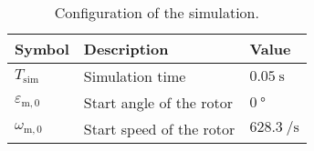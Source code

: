 \begin{table}[htb]
    \caption{Configuration of the simulation.}
    \centering
    \begin{tabular}{lll}\toprule
    Symbol  & Description       & Value \\
    \midrule
    $T_{\mathrm{sim}}$  & Simulation time           & $\SI{0.05}{\second}$ \\
    $\varepsilon_{\mathrm{m,0}}$    & Start angle of the rotor  & $\SI{0}{\degree}$ \\
    $\omega_{\mathrm{m,0}}$    & Start speed of the rotor  & $\SI{628.3}{\per\second}$ \\
    \bottomrule
    \end{tabular}
    \label{tab:config_simulation}
\end{table}


